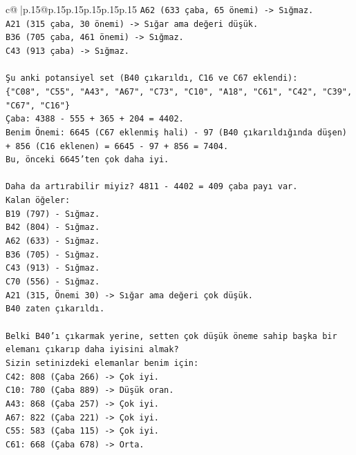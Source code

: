 \documentclass{article}
\begin{document}
{\begin{supertabular}{c@{$\;$}|p{.15\linewidth}@{}p{.15\linewidth}p{.15\linewidth}p{.15\linewidth}p{.15\linewidth}p{.15\linewidth}}
{{{\texttt{A62 (633 çaba, 65 önemi) {-}> Sığmaz.} \\
\texttt{A21 (315 çaba, 30 önemi) {-}> Sığar ama değeri düşük.} \\
\texttt{B36 (705 çaba, 461 önemi) {-}> Sığmaz.} \\
\texttt{C43 (913 çaba) {-}> Sığmaz.} \\
\\ 
\texttt{Şu anki potansiyel set (B40 çıkarıldı, C16 ve C67 eklendi):} \\
\texttt{\{"C08", "C55", "A43", "A67", "C73", "C10", "A18", "C61", "C42", "C39", "C67", "C16"\}} \\
\texttt{Çaba: 4388 {-} 555 + 365 + 204 = 4402.} \\
\texttt{Benim Önemi: 6645 (C67 eklenmiş hali) {-} 97 (B40 çıkarıldığında düşen) + 856 (C16 eklenen) = 6645 {-} 97 + 856 = 7404.} \\
\texttt{Bu, önceki 6645'ten çok daha iyi.} \\
\\ 
\texttt{Daha da artırabilir miyiz? 4811 {-} 4402 = 409 çaba payı var.} \\
\texttt{Kalan öğeler:} \\
\texttt{B19 (797) {-} Sığmaz.} \\
\texttt{B42 (804) {-} Sığmaz.} \\
\texttt{A62 (633) {-} Sığmaz.} \\
\texttt{B36 (705) {-} Sığmaz.} \\
\texttt{C43 (913) {-} Sığmaz.} \\
\texttt{C70 (556) {-} Sığmaz.} \\
\texttt{A21 (315, Önemi 30) {-}> Sığar ama değeri çok düşük.} \\
\texttt{B40 zaten çıkarıldı.} \\
\\ 
\texttt{Belki B40'ı çıkarmak yerine, setten çok düşük öneme sahip başka bir elemanı çıkarıp daha iyisini almak?} \\
\texttt{Sizin setinizdeki elemanlar benim için:} \\
\texttt{C42: 808 (Çaba 266) {-}> Çok iyi.} \\
\texttt{C10: 780 (Çaba 889) {-}> Düşük oran.} \\
\texttt{A43: 868 (Çaba 257) {-}> Çok iyi.} \\
\texttt{A67: 822 (Çaba 221) {-}> Çok iyi.} \\
\texttt{C55: 583 (Çaba 115) {-}> Çok iyi.} \\
\texttt{C61: 668 (Çaba 678) {-}> Orta.} \\
}}}
\end{supertabular}}
\end{document}
